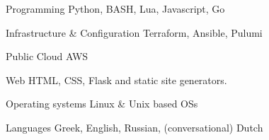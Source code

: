 


\begin{cvskills}


\cvskill
{Programming} %
{Python, BASH, Lua, Javascript, Go} %


\cvskill
{Infrastructure \& Configuration} %
{Terraform, Ansible, Pulumi} %


\cvskill
{Public Cloud} %
{AWS} %


\cvskill
{Web} %
{HTML, CSS, Flask and static site generators.} %


\cvskill
{Operating systems} %
{Linux \& Unix based OSs} %




\cvskill
{Languages} %
{Greek, English, Russian, (conversational) Dutch} %

\end{cvskills}
